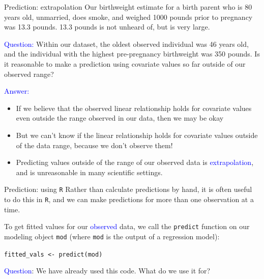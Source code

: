 \documentclass[10pt,t]{beamer}
\begin{document}
\begin{frame}{Prediction: extrapolation}
	\vspace{-0.5cm}
Our birthweight estimate for a birth parent who is 80 years old, unmarried, does smoke, and weighed 1000 pounds prior to pregnancy was 13.3 pounds. 13.3 pounds is not unheard of, but is very large.

\vspace{0.3cm}

\textcolor{blue}{Question:} Within our dataset, the oldest observed individual was 46 years old, and the individual with the highest pre-pregnancy birthweight was 350 pounds. Is it reasonable to make a prediction using covariate values so far outside of our observed range?  

\vspace{0.3cm}

\textcolor{blue}{Answer:} 
\begin{itemize}
\item If we believe that the observed linear relationship holds for covariate values even outside the range observed in our data, then we may be okay

\medskip

\item But we can't know if the linear relationship holds for covariate values outside of the data range, because we don't observe them! 

\medskip

\item Predicting values outside of the range of our observed data is \textcolor{blue}{extrapolation}, and is unreasonable in many scientific settings.
\end{itemize}
\end{frame}

\begin{frame}{Prediction: using \texttt{R}}
Rather than calculate predictions by hand, it is often useful to do this in \texttt{R}, and we can make predictions for more than one observation at a time.

\vspace{0.3cm}

To get fitted values for our \textcolor{blue}{observed} data, we call the \texttt{predict} function on our modeling object \texttt{mod} (where \texttt{mod} is the output of a regression model):

\vspace{0.3cm}

\texttt{fitted\_vals <- predict(mod)}


\bigskip

\textcolor{blue}{Question}: We have already used this code. What do we use it for?

\end{frame}
\end{document}
